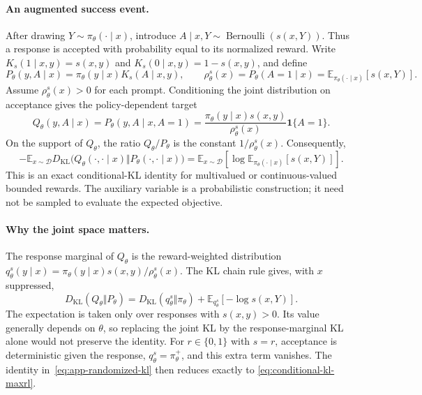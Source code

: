\paragraph{An augmented success event.}
After drawing $Y\sim\pi_\theta(\cdot\mid x)$, introduce
$A\mid x,Y\sim\operatorname{Bernoulli}(s(x,Y))$. Thus a response is
accepted with probability equal to its normalized reward. Write
$K_s(1\mid x,y)=s(x,y)$ and $K_s(0\mid x,y)=1-s(x,y)$, and define
\begin{equation}
 P_\theta(y,A\mid x)=\pi_\theta(y\mid x)K_s(A\mid x,y),
 \qquad
 \rho_\theta^s(x)=P_\theta(A=1\mid x)
 =\mathbb E_{\pi_\theta(\cdot\mid x)}[s(x,Y)].
 \label{eq:app-randomized-joint}
\end{equation}
Assume $\rho_\theta^s(x)>0$ for each prompt. Conditioning the joint
distribution on acceptance gives the policy-dependent target
\begin{equation}
 Q_\theta(y,A\mid x)
 =P_\theta(y,A\mid x,A=1)
 =\frac{\pi_\theta(y\mid x)s(x,y)}{\rho_\theta^s(x)}
   \mathbf1\{A=1\}.
 \label{eq:app-randomized-target}
\end{equation}
On the support of $Q_\theta$, the ratio $Q_\theta/P_\theta$ is the
constant $1/\rho_\theta^s(x)$. Consequently,
\begin{equation}
 -\mathbb E_{x\sim\mathcal D}
 D_{\mathrm{KL}}\bigl(Q_\theta(\cdot,\cdot\mid x)
                 \Vert P_\theta(\cdot,\cdot\mid x)\bigr)
 =\mathbb E_{x\sim\mathcal D}
   \left[\log\mathbb E_{\pi_\theta(\cdot\mid x)}[s(x,Y)]\right].
 \label{eq:app-randomized-kl}
\end{equation}
This is an exact conditional-KL identity for multivalued or continuous-valued
bounded rewards. The auxiliary variable is a probabilistic construction;
it need not be sampled to evaluate the expected objective.

\paragraph{Why the joint space matters.}
The response marginal of $Q_\theta$ is the reward-weighted distribution
$q_\theta^s(y\mid x)=\pi_\theta(y\mid x)s(x,y)/\rho_\theta^s(x)$.
The KL chain rule gives, with $x$ suppressed,
\begin{equation}
 D_{\mathrm{KL}}(Q_\theta\Vert P_\theta)
 =D_{\mathrm{KL}}(q_\theta^s\Vert\pi_\theta)
  +\mathbb E_{q_\theta^s}[-\log s(x,Y)].
 \label{eq:app-randomized-marginal-kl}
\end{equation}
The expectation is taken only over responses with $s(x,y)>0$.
Its value generally depends on $\theta$, so replacing the joint KL by
the response-marginal KL alone would not preserve the identity.
For $r\in\{0,1\}$ with $s=r$, acceptance is deterministic given the
response, $q_\theta^s=\pi_\theta^+$, and this extra term vanishes.
The identity in~\eqref{eq:app-randomized-kl} then reduces exactly to
\eqref{eq:conditional-kl-maxrl}.

